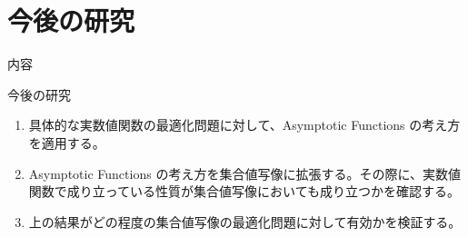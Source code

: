\documentclass[aspectratio=169, dvipdfmx, 11pt]{beamer} %
\begin{document}
\section{今後の研究}
\begin{frame}{内容}
  \tableofcontents[currentsection]
\end{frame}

\begin{frame}{今後の研究}
  \begin{enumerate}
    \item 具体的な実数値関数の最適化問題に対して、Asymptotic Functions の考え方を適用する。
    \item Asymptotic Functions の考え方を集合値写像に拡張する。その際に、実数値関数で成り立っている性質が集合値写像においても成り立つかを確認する。
    \item 上の結果がどの程度の集合値写像の最適化問題に対して有効かを検証する。
  \end{enumerate}
\end{frame}
\end{document}
